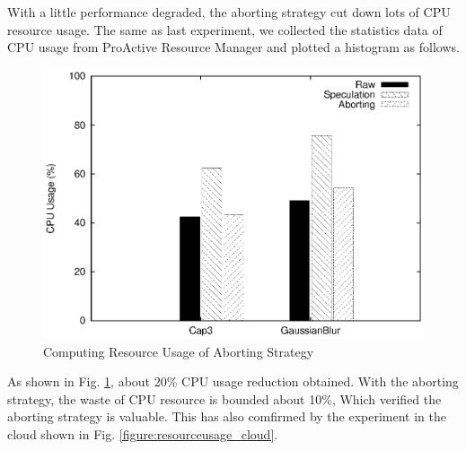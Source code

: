 With a little performance degraded, the aborting strategy cut down lots of CPU resource usage. The same as last experiment, we collected the statistics data of CPU usage from ProActive Resource Manager and plotted a histogram as follows.

\begin{figure}
\centering
\includegraphics[width=0.9\columnwidth]{figures/abort_resource_usage.eps}
\caption{Computing Resource Usage of Aborting Strategy}
\label{figure:abort_resourceusage}
\end{figure}

As shown in Fig. \ref{figure:abort_resourceusage}, about 20\% CPU usage reduction obtained. With the aborting strategy, the waste of CPU resource is bounded about 10\%, Which verified the aborting strategy is valuable. This has also comfirmed by the experiment in the cloud shown in Fig. \ref{figure:resourceusage_cloud}. 